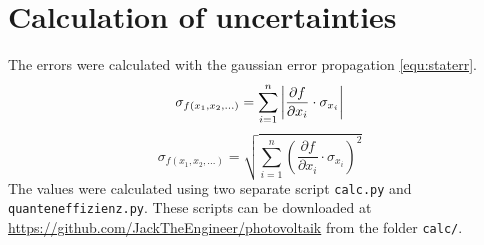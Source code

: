 \section{Calculation of uncertainties}
The errors were calculated with the gaussian error propagation 
\ref{equ:staterr}.
\begin{equation}
	\sigma_{f(x_1,x_2,...)} = \sum\limits_{i=1}^n \left\vert\frac{\partial f}{\partial x_i}\cdot \sigma_{x_i}\right\vert
	\label{equ:syserr}
\end{equation}
\begin{equation}
	\sigma_{f(x_1,x_2,...)} = \sqrt{\sum\limits_{i=1}^n (\frac{\partial f}{\partial x_i} \cdot \sigma_{x_i})^2}
	\label{equ:staterr}
\end{equation}
The values were calculated using two separate script \texttt{calc.py} and \texttt{quanteneffizienz.py}.
These scripts can be downloaded at \url{https://github.com/JackTheEngineer/photovoltaik}
 from the folder \texttt{calc/}. 



